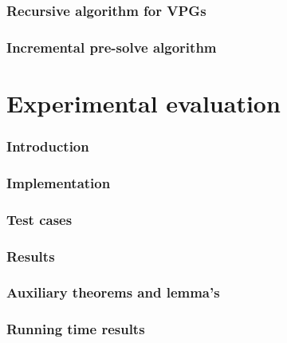 \documentclass[]{article}
\begin{document}
\section{Recursive algorithm for VPGs}


\section{Incremental pre-solve algorithm}


\pagebreak
\part{Experimental evaluation}
\section{Introduction}


\section{Implementation}


\section{Test cases}


\section{Results}


\pagebreak
\begin{appendices}
\section{Auxiliary theorems and lemma's}
\label{appendix:proves}

\section{Running time results}
\label{appendix:resultsexact}

\end{appendices}

 

\end{document}
